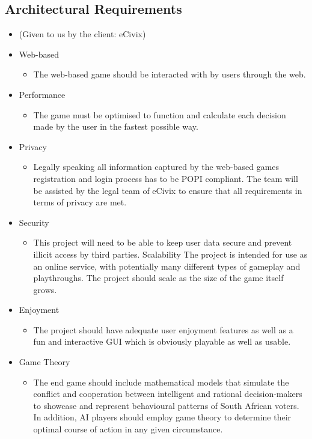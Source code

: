 \documentclass{article}
\begin{document}
   \subsection{Architectural Requirements}
   \begin{itemize}
   \item (Given to us by the client: eCivix)
        \item Web-based
		\begin{itemize}
			\item The web-based game should be interacted with by users through the web.
	    \end{itemize}
	    
	    \item Performance
		\begin{itemize}
			\item The game must be optimised to function and calculate each decision made by the user in the fastest possible way.
	    \end{itemize}
	    
	    \item Privacy 
		\begin{itemize}
			\item Legally speaking all information captured by the web-based games registration and login process has to be POPI compliant. The team will be assisted by the legal team of eCivix to ensure that all requirements in terms of privacy are met. 
	    \end{itemize}
	    
	    \item Security
		\begin{itemize}
			\item This project will need to be able to keep user data secure and prevent illicit access by third parties. 
            Scalability 
            The project is intended for use as an online service, with potentially many different types of gameplay and playthroughs. The project should scale as the size of the game itself grows. 

	    \end{itemize}
	    
	    \item Enjoyment
		\begin{itemize}
			\item The project should have adequate user enjoyment features as well as a fun and interactive GUI which is obviously playable as well as usable. 
	    \end{itemize}
	    
	    \item Game Theory 
		\begin{itemize}
			\item The end game should include mathematical models that simulate the conflict and cooperation between intelligent and rational decision-makers to showcase and represent behavioural patterns of South African voters. In addition, AI players should employ game theory to determine their optimal course of action in any given circumstance.
	    \end{itemize}
   
   \end{itemize}
\end{document}
